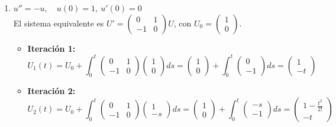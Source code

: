 {\begin{enumerate} [label=\alph*)]
\begin{itemize}
                En el límite, esto converge a la serie exponencial:
                $$u(t) = e^{-t}$$
            \end{itemize}  
        \item $u'' = -u, \quad u(0) = 1, \ u'(0) = 0$ \\
            El sistema equivalente es $U' = \begin{pmatrix} 0 & 1 \\ -1 & 0 \end{pmatrix} U$, con $U_0 = \begin{pmatrix} 1 \\ 0 \end{pmatrix}$.

            \begin{itemize}
                \item \textbf{Iteración 1:}
                $$U_1(t) = U_0 + \int_0^t \begin{pmatrix} 0 & 1 \\ -1 & 0 \end{pmatrix} \begin{pmatrix} 1 \\ 0 \end{pmatrix} ds = \begin{pmatrix} 1 \\ 0 \end{pmatrix} + \int_0^t \begin{pmatrix} 0 \\ -1 \end{pmatrix} ds = \begin{pmatrix} 1 \\ -t \end{pmatrix}$$
                \item \textbf{Iteración 2:}
                $$U_2(t) = U_0 + \int_0^t \begin{pmatrix} 0 & 1 \\ -1 & 0 \end{pmatrix} \begin{pmatrix} 1 \\ -s \end{pmatrix} ds = \begin{pmatrix} 1 \\ 0 \end{pmatrix} + \int_0^t \begin{pmatrix} -s \\ -1 \end{pmatrix} ds = \begin{pmatrix} 1 - \frac{t^2}{2!} \\ -t \end{pmatrix}$$

\end{itemize}
\end{enumerate}}
